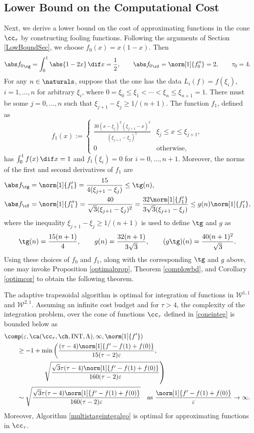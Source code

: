 \subsection{Lower Bound on the Computational Cost}
Next, we derive a lower bound on the cost of approximating functions in the cone $\cc_{\tau}$ by constructing fooling functions. Following the arguments of Section \ref{LowBoundSec}, we choose  $f_0(x)=x(1-x).$ Then
\[
\Gnorm{f_0}=\int_0^1 \abs{1-2x} \, \dif x = \frac{1}{2}, \qquad \Fnorm{f_0}=\norm[1]{f''_0}=2, \qquad \tau_0=4.
\]
For any $n \in \naturals$, suppose that the one has the data $L_i(f)=f(\xi_i)$, $i=1, \ldots, n$ for arbitrary $\xi_i$, where $0=\xi_0 \le \xi_1 < \cdots < \xi_n \le \xi_{n+1} = 1$.  There must be some $j=0, \ldots, n$ such that $\xi_{j+1} - \xi_j \ge 1/(n+1)$.  The function $f_{1}$, defined as
$$
f_{1}(x):=\begin{cases} \displaystyle
\frac{30(x-\xi_{j})^{2}(\xi_{j+1}-x)^{2}}{(\xi_{j+1}-\xi_{j})^5} & \xi_{j} \le x \leq \xi_{j+1},\\
0 & \text{otherwise},
\end{cases}
$$
has $\int_0^1 f(x) \, \dif x=1$ and $f_1(\xi_i)=0$ for $i=0, \ldots, n+1$.  Moreover, the norms of the first and second derivatives of $f_1$ are
\begin{align*}
\Gnorm{f}&=\norm[1]{f'_1}=\frac{15}{4(\xi_{j+1}-\xi_{j})}\leq \tg(n),\\
\Fnorm{f}&=\norm[1]{f''_1}=\frac{40}{\sqrt{3}(\xi_{j+1}-\xi_{j})^2}
=\frac{32\norm[1]{f'_1}}{3\sqrt{3}(\xi_{j+1}-\xi_{j})}
 \leq g(n) \norm[1]{f'_1},
\end{align*}
where the inequality $\xi_{j+1} - \xi_j \ge 1/(n+1)$ is used to define $\tg$ and $g$ as
\[
\tg(n) = \frac{15(n+1)}{4}, \qquad g(n) = \frac{32(n+1)}{3\sqrt{3}}, \qquad (g\tg)(n) = \frac{40(n+1)^2}{\sqrt{3}}.
\]
Using these choices of $f_0$ and $f_1$, along with the corresponding $\tg$ and $g$ above, one may invoke Proposition \ref{optimalprop}, Theorem \ref{complowbd}, and Corollary \ref{optimcor} to obtain the following theorem.

\begin{theorem} \label{complowbdinteg} The adaptive trapezoidal algorithm is optimal for integration of functions in $\mathcal{W}^{1,1}$ and $\mathcal{W}^{2,1}$. Assuming an infinite cost budget and for $\tau>4$, the complexity of the integration problem, over the cone of functions $\cc_{\tau}$ defined in \eqref{coneinteg} is bounded below as
\begin{align*}
\MoveEqLeft{\comp(\varepsilon,\ca(\cc_{\tau},\ch,\INT,\Lambda),\infty,\norm[1]{f'})}\\
&\ge -1+ \min\left(\frac{(\tau-4)\norm[1]{f'-f(1)+f(0)}}{15(\tau-2) \varepsilon}, \right .\\
&\qquad \qquad \left . \sqrt{\frac{\sqrt{3}\tau(\tau-4)\norm[1]{f'-f(1)+f(0)}}{160(\tau-2)\varepsilon}} \right)\\
& \sim \sqrt{\frac{\sqrt{3}\tau(\tau-4)\norm[1]{f'-f(1)+f(0)}}{160(\tau-2)\varepsilon}}   \quad\text{as } \frac{\norm[1]{f'-f(1)+f(0)}}{\varepsilon} \to \infty.
\end{align*}
Moreover, Algorithm \ref{multistageintegalgo} is optimal for approximating functions in $\cc_{\tau}$.
\end{theorem}

